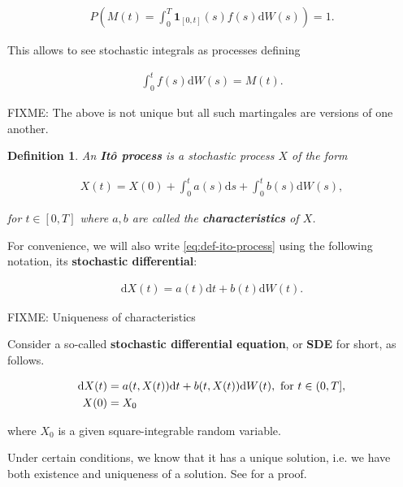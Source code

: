 \documentclass[a4paper]{article}
\newtheorem{definition}{Definition}[section]
\begin{document}
\begin{align*}
  P\left(M(t) = \int_0^T \mathbf{1}_{[0,t]}(s) f(s) \mathrm{d}W(s)\right) = 1.
\end{align*}

This allows to see stochastic integrals as processes defining

\begin{align*}
  \int_0^t f(s) \mathrm{d}W(s) = M(t).
\end{align*}

FIXME: The above is not unique but all such martingales are versions of one another.

\begin{definition}
  An \textbf{It\^o process} is a stochastic process $X$ of the form

  \begin{align}\label{eq:def-ito-process}
    X(t) = X(0) + \int_0^t a(s) \mathrm{d}s + \int_0^t b(s) \mathrm{d}W(s),
  \end{align}

  for $t \in [0,T]$ where $a,b$ are called the \textbf{characteristics} of $X$.
\end{definition}

For convenience, we will also write \eqref{eq:def-ito-process} using the following notation, its \textbf{stochastic differential}:

\begin{align}\label{eq:stoch-diff-notation}
  \mathrm{d}X(t) = a(t) \mathrm{d}t + b(t) \mathrm{d}W(t).
\end{align}

FIXME: Uniqueness of characteristics

Consider a so-called \textbf{stochastic differential equation}, or \textbf{SDE} for short, as follows.

\begin{align}\label{eq:sde-init-value}
  \mathrm{d}X(t) &= a(t,X(t)) \mathrm{d}t + b(t,X(t)) \mathrm{d}W(t), \text{ for } t \in (0,T],\\
  X(0) &= X_0\notag
\end{align}

where $X_0$ is a given square-integrable random variable.

Under certain conditions, we know that it has a unique solution, i.e. we have both existence and uniqueness of a solution. See \textcite{capinski_stochastic_2012} for a proof.
\end{document}
